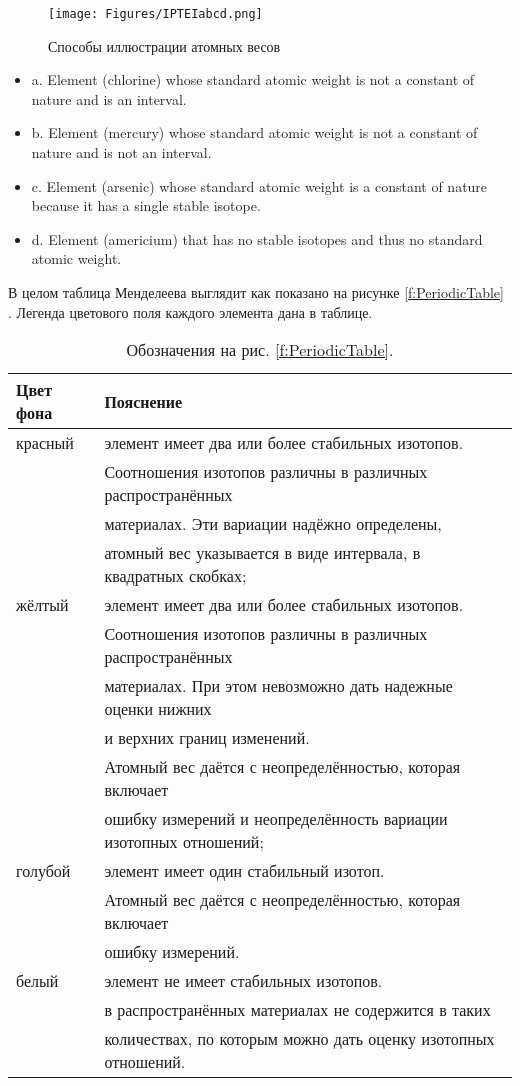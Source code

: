 \documentclass[a5paper,openany]{book}
\begin{document}
\begin{figure}[ht] 
	\centering\small
	\unitlength=1mm
	\texttt{[image: Figures/IPTEIabcd.png]} 
	\caption{Способы иллюстрации атомных весов} 
	\label{f:IPTEIabcd}
\end{figure}
\begin{itemize}
	\item a. Element (chlorine)	whose standard atomic weight is not a constant of nature and is an interval.
	\item  b. Element (mercury) whose standard atomic weight is not a constant of nature and is not an interval.
	\item  c. Element (arsenic) whose standard atomic weight is a constant of nature because it has a single
	stable isotope. 
	\item d. Element (americium) that has no stable isotopes and thus no standard atomic weight.
\end{itemize}



В целом таблица Менделеева выглядит как показано на рисунке \ref{f:PeriodicTable} \cite{IUPAC}.
Легенда цветового поля каждого элемента дана в таблице.\\
\begin{table}
{\footnotesize 
\begin{tabular}{ll}
	Цвет фона & Пояснение \\
	\hline	
	красный & элемент имеет два или более стабильных изотопов. \\
	~ &	Соотношения изотопов различны в различных распространённых  \\
	~ & материалах. Эти вариации надёжно определены, \\
	~ &  атомный вес указывается в виде интервала, в квадратных скобках; \\
	\hline
	жёлтый & элемент имеет два или более стабильных изотопов. \\
	~ & Соотношения изотопов различны в различных распространённых  \\
	~ & материалах. При этом невозможно дать надежные оценки нижних  \\
	~& и верхних границ изменений. \\
	~ & Атомный вес даётся с неопределённостью, которая включает  \\
	~ & ошибку измерений и неопределённость вариации изотопных отношений; \\
	\hline
	голубой& элемент имеет один стабильный изотоп.  \\
	~ & Атомный вес даётся с неопределённостью, которая включает\\ 
	~ & ошибку измерений. \\
	\hline	
	белый & элемент не имеет стабильных изотопов.	\\
	~ & в распространённых материалах не содержится в таких  \\
	~ & количествах, по которым можно дать оценку изотопных отношений.\\
	\hline
\end{tabular} 
\caption{Обозначения на рис. \ref{f:PeriodicTable}.}
}
\end{table}
\end{document}
